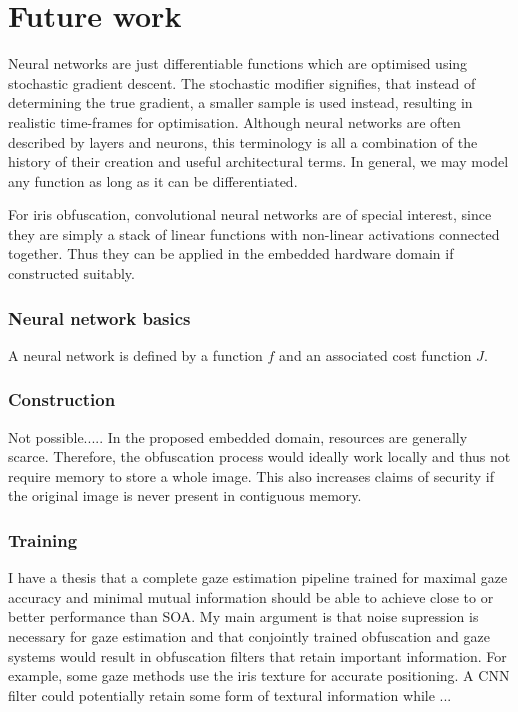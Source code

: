 \chapter{Future work}

Neural networks are just differentiable functions which are optimised using stochastic gradient descent. The stochastic modifier signifies, that instead of determining the true gradient, a smaller sample is used instead, resulting in realistic time-frames for optimisation. Although neural networks are often described by layers and neurons, this terminology is all a combination of the history of their creation and useful architectural terms. In general, we may model any function as long as it can be differentiated.

For iris obfuscation, convolutional neural networks are of special interest, since they are simply a stack of linear functions with non-linear activations connected together. Thus they can be applied in the embedded hardware domain if constructed suitably.

\subsection{Neural network basics}
A neural network is defined by a function $f$ and an associated cost function $J$. 

\subsection{Construction}
Not possible.....  In the proposed embedded domain, resources are generally scarce. Therefore, the obfuscation process would ideally work locally and thus not require memory to store a whole image. This also increases claims of security if the original image is never present in contiguous memory.

\subsection{Training}
I have a thesis that a complete gaze estimation pipeline trained for maximal gaze accuracy and minimal mutual information should be able to achieve close to or better performance than SOA. My main argument is that noise supression is necessary for gaze estimation and that conjointly trained obfuscation and gaze systems would result in obfuscation filters that retain important information. For example, some gaze methods use the iris texture for accurate positioning. A CNN filter could potentially retain some form of textural information while ...


